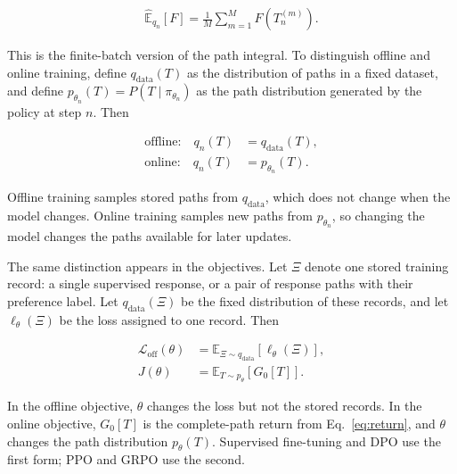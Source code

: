 \documentclass[11pt]{article}
\newcommand{\E}{\mathbb{E}}
\begin{document}
\begin{equation}
    \begin{split}
        \widehat{\E}_{q_n}[F]
        =\frac{1}{M}\sum_{m=1}^{M}F(T_n^{(m)}).
    \end{split}
    \label{eq:batch-average}
\end{equation}

This is the finite-batch version of the path integral.  To distinguish offline
and online training, define \(q_{\mathrm{data}}(T)\) as the distribution of
paths in a fixed dataset, and define
\(p_{\theta_n}(T)=P(T\mid\pi_{\theta_n})\) as the path distribution
generated by the policy at step \(n\).  Then

\begin{equation}
    \begin{split}
    \text{offline:}\quad q_n(T)&=q_{\mathrm{data}}(T),\\
    \text{online:}\quad q_n(T)&=p_{\theta_n}(T).
    \end{split}
    \label{eq:offline-online}
\end{equation}

Offline training samples stored paths from \(q_{\mathrm{data}}\), which does
not change when the model changes.  Online training samples new paths from
\(p_{\theta_n}\), so changing the model changes the paths available for later
updates.

The same distinction appears in the objectives.  Let \(\Xi\) denote one
stored training record: a single supervised response, or a pair of response
paths with their preference label.  Let \(q_{\mathrm{data}}(\Xi)\) be the
fixed distribution of these records, and let \(\ell_\theta(\Xi)\) be the loss
assigned to one record.  Then

\begin{equation}
    \begin{split}
    \mathcal L_{\mathrm{off}}(\theta)
      &=\E_{\Xi\sim q_{\mathrm{data}}}
        \left[\ell_\theta(\Xi)\right],\\
    J(\theta)
      &=\E_{T\sim p_\theta}\left[G_0[T]\right].
    \end{split}
    \label{eq:offline-online-objectives}
\end{equation}

In the offline objective, \(\theta\) changes the loss but not the stored
records.  In the online objective, \(G_0[T]\) is the complete-path return from
Eq.~\eqref{eq:return}, and \(\theta\) changes the path distribution
\(p_\theta(T)\).  Supervised fine-tuning and DPO use the first form; PPO and
GRPO use the second.
\end{document}
